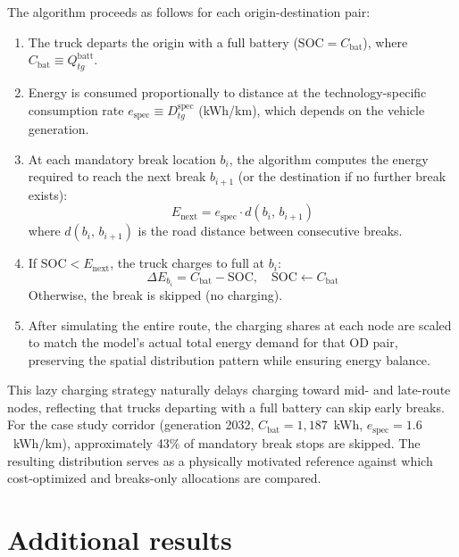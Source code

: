 The algorithm proceeds as follows for each origin-destination pair:
\begin{enumerate}
    \item The truck departs the origin with a full battery ($\mathrm{SOC} = C_{\mathrm{bat}}$), where $C_{\mathrm{bat}} \equiv Q^{\mathrm{batt}}_{tg}$.
    \item Energy is consumed proportionally to distance at the technology-specific consumption rate $e_{\mathrm{spec}} \equiv D^{\mathrm{spec}}_{tg}$ (kWh/km), which depends on the vehicle generation.
    \item At each mandatory break location $b_i$, the algorithm computes the energy required to reach the next break $b_{i+1}$ (or the destination if no further break exists):
    \begin{equation}\label{equ:app_rq3_e_next}
        E_{\mathrm{next}} = e_{\mathrm{spec}} \cdot d(b_i,\, b_{i+1})
    \end{equation}
    where $d(b_i,\, b_{i+1})$ is the road distance between consecutive breaks.
    \item If $\mathrm{SOC} < E_{\mathrm{next}}$, the truck charges to full at $b_i$:
    \begin{equation}\label{equ:app_rq3_delta_e}
        \Delta E_{b_i} = C_{\mathrm{bat}} - \mathrm{SOC}, \quad \mathrm{SOC} \leftarrow C_{\mathrm{bat}}
    \end{equation}
    Otherwise, the break is skipped (no charging).
    \item After simulating the entire route, the charging shares at each node are scaled to match the model's actual total energy demand for that OD pair, preserving the spatial distribution pattern while ensuring energy balance.
\end{enumerate}

This lazy charging strategy naturally delays charging toward mid- and late-route nodes, reflecting that trucks departing with a full battery can skip early breaks. For the case study corridor (generation 2032, $C_{\mathrm{bat}} = 1{,}187$~kWh, $e_{\mathrm{spec}} = 1.6$~kWh/km), approximately 43\% of mandatory break stops are skipped. The resulting distribution serves as a physically motivated reference against which cost-optimized and breaks-only allocations are compared.

\section{Additional results}\label{app:rq3_additional_results}

